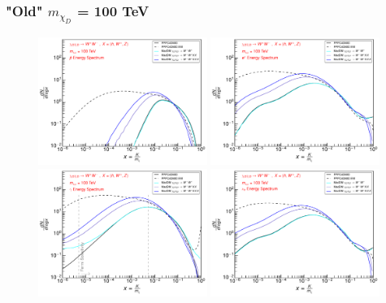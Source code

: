 \documentclass[epj,nopacs,fleqn]{svjour}
\begin{document}
\subsubsection{"Old" $m_{\chi_D}$ = 100 TeV}
\begin{figure}[!b]
\centering
\subfigure
{ \includegraphics[width=0.49\textwidth]{Fig/100TeV_OLD/OLD_100000_antiprotons_PPPC_Comparison_xdxd_100000.pdf}}
\subfigure
{ \includegraphics[width=0.49\textwidth]{Fig/100TeV_OLD/OLD_100000_positrons_PPPC_Comparison_xdxd_100000.pdf}}
\subfigure
{ \includegraphics[width=0.49\textwidth]{Fig/100TeV_OLD/OLD_100000_gammas_PPPC_Comparison_xdxd_100000.pdf}}
\subfigure
{ \includegraphics[width=0.49\textwidth]{Fig/100TeV_OLD/OLD_100000_neutrinos_e_PPPC_Comparison_xdxd_100000.pdf}}

\end{figure}
\end{document}
